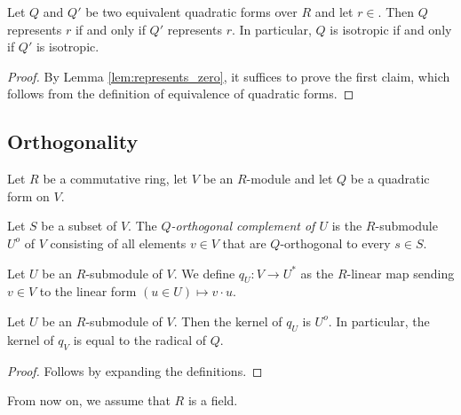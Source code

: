 \begin{lemma}\label{lem:represents_iff}
\leanok
{}
Let $Q$ and $Q'$ be two equivalent quadratic forms over $R$ and let $r \in $. Then $Q$ represents $r$ if and only if $Q'$ represents $r$. In particular, $Q$ is isotropic if and only if $Q'$ is isotropic.
\end{lemma}

\begin{proof}
\leanok
By Lemma \ref{lem:represents_zero}, it suffices to prove the first claim, which follows from the definition of equivalence of quadratic forms.
\end{proof}

\subsection{Orthogonality}\label{subsec:ortho}

Let $R$ be a commutative ring, let $V$ be an $R$-module and let $Q$ be a quadratic form on $V$.

\begin{definition}\label{def:ortho_compl}
\leanok 
Let $S$ be a subset of $V$. The \emph{$Q$-orthogonal complement of $U$} is the $R$-submodule $U^o$ of $V$ consisting of all elements $v \in V$ that are $Q$-orthogonal to every $s \in S$.
\end{definition} 

\begin{definition}\label{def:to_dual}
\leanok 
Let $U$ be an $R$-submodule of $V$. We define $q_U : V \to U^*$ as the $R$-linear map sending $v \in V$ to the linear form $(u \in U) \mapsto v \cdot u$.
\end{definition} 

\begin{lemma}\label{lem:ker_to_dual}
Let $U$ be an $R$-submodule of $V$. Then the kernel of $q_U$ is $U^o$. In particular, the kernel of $q_V$ is equal to the radical of $Q$.
\leanok
{}
\end{lemma}
\begin{proof}
\leanok
Follows by expanding the definitions.
\end{proof}

From now on, we assume that $R$ is a field.

